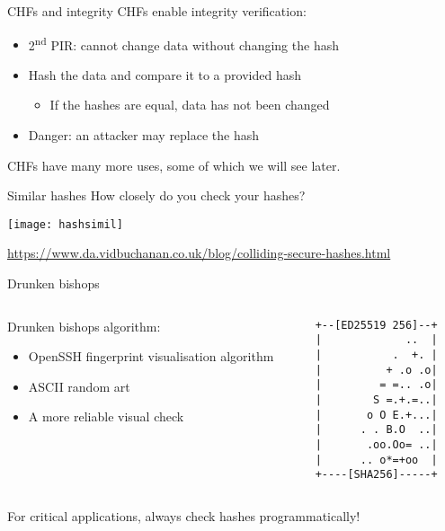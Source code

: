 \begin{frame}{CHFs and integrity}
  CHFs enable integrity verification:
  \begin{itemize}[<+(1)->]
    \item 2\textsuperscript{nd} PIR: cannot change data without changing the hash
    \item Hash the data and compare it to a provided hash
    \begin{itemize}
      \item If the hashes are equal, data has not been changed
    \end{itemize}
    \item Danger: an attacker may replace the hash
  \end{itemize}

  \vspace*{1em}

  \pause
  CHFs have many more uses, some of which we will see later.
\end{frame}

\begin{frame}{Similar hashes}
  \pause
  How closely do you check your hashes?
  \begin{center}
    \texttt{[image: hashsimil]}
  \end{center}
  \vfill
  {\scriptsize\url{https://www.da.vidbuchanan.co.uk/blog/colliding-secure-hashes.html}}
\end{frame}

\begin{frame}[fragile]{Drunken bishops}
  \begin{columns}[onlytextwidth]
    \begin{column}{0.6\textwidth}
      \pause
      Drunken bishops algorithm:
      \begin{itemize}[<+(1)->]
        \item OpenSSH fingerprint visualisation algorithm
        \item ASCII random art
        \item A more reliable visual check
      \end{itemize}
    \end{column}
    \begin{column}{0.3\textwidth}
      \begin{Verbatim}[fontsize=\scriptsize]
+--[ED25519 256]--+
|             ..  |
|           .  +. |
|          + .o .o|
|         = =.. .o|
|        S =.+.=..|
|       o O E.+...|
|      . . B.O  ..|
|       .oo.Oo= ..|
|      .. o*=+oo  |
+----[SHA256]-----+
      \end{Verbatim}
    \end{column}
  \end{columns}

  \vfill

  \pause
  For critical applications, always check hashes programmatically!
\end{frame}

